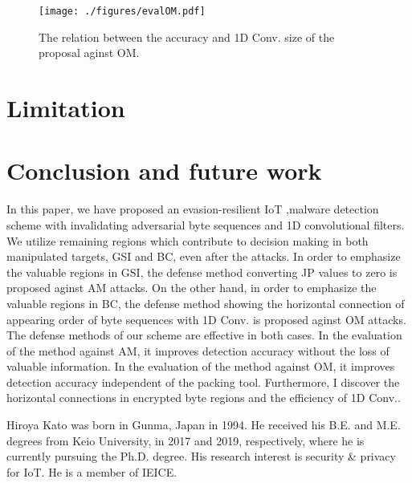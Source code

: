 \documentclass{ieeeaccess}
\begin{document}
\begin{figure}[t]
 \centering
 \texttt{[image: ./figures/evalOM.pdf]}
 \caption{The relation between the accuracy and 1D Conv. size of the proposal aginst OM.} 
 \label{fig:evalOM}
\end{figure}

\section{Limitation} \label{sec:limitation}
\section{Conclusion and future work} \label{sec:conclusion}
In this paper, we have proposed an evasion-resilient IoT ,malware detection scheme with invalidating adversarial byte sequences and 1D convolutional filters. 
We utilize remaining regions which contribute to decision making in both manipulated targets, GSI and BC, even after the attacks.
In order to emphasize the valuable regions in GSI, the defense method converting JP values to zero is proposed aginst AM attacks.
On the other hand, in order to emphasize the valuable regions in BC, the defense method showing the horizontal connection of appearing order of byte sequences with 1D Conv. is proposed aginst OM attacks.
The defense methods of our scheme are effective in both cases.
In the evaluation of the method against AM, it improves detection accuracy without the loss of valuable information.
In the evaluation of the method against OM, it improves detection accuracy independent of the packing tool.
Furthermore, I discover the horizontal connections in encrypted byte regions and the efficiency of 1D Conv..



\begin{IEEEbiography}{Hiroya Kato} was born in Gunma, Japan in 1994. He received his B.E. and M.E. degrees from Keio University, in 2017 and 2019, respectively, where he is currently pursuing the Ph.D. degree. His research interest is security \& privacy for IoT. He is a member of IEICE.
\end{IEEEbiography} 
\end{document}
